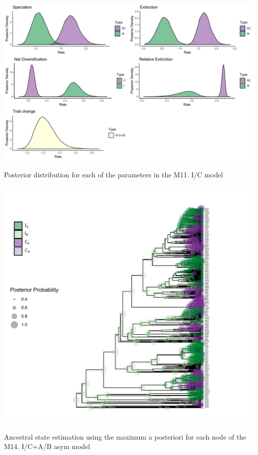 \begin{suppfigure}
\includegraphics[width=\textwidth]{bisseSIposteriordist.pdf}
\caption{Posterior distribution for each of the parameters in the M11. I/C model} %
\label{suppfigure:IC}
\end{suppfigure}

\begin{suppfigure}
\includegraphics[width=\textwidth]{asrICAB.pdf}
\caption{Ancestral state estimation using the maximum a posteriori for each node of the M14. I/C+A/B asym model} %
\label{suppfigure:ICABasr}
\end{suppfigure}

